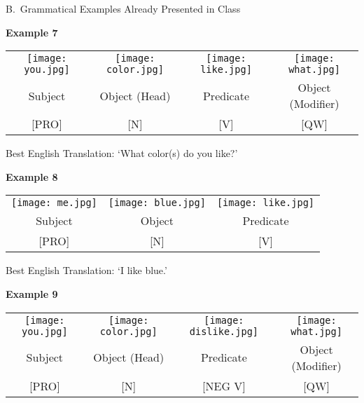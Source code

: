 \documentclass{tufte-book}
\begin{document}
\vspace{0.25cm}\noindent B.~Grammatical Examples Already Presented in Class

\vspace{0.25cm}\noindent \textbf{Example 7}
\begin{table*}[h!]
\begin{tabular}{c | c | c | c}
\texttt{[image: you.jpg]}&\texttt{[image: color.jpg]}&\texttt{[image: like.jpg]} & \texttt{[image: what.jpg]} \\
\footnotesize Subject & \footnotesize Object (Head) & \footnotesize Predicate & \footnotesize Object (Modifier)  \\
\footnotesize [PRO] & \footnotesize [N] & \footnotesize [V] &  \footnotesize [QW]\\
\end{tabular}
\end{table*}

Best English Translation: `What color(s) do you like?'

\vspace{0.25cm}\noindent \textbf{Example 8}
\begin{table*}[h!]
\begin{tabular}{c | c | c }
\texttt{[image: me.jpg]}&\texttt{[image: blue.jpg]}&\texttt{[image: like.jpg]} \\
\footnotesize Subject & \footnotesize Object & \footnotesize Predicate   \\
\footnotesize [PRO] & \footnotesize [N] & \footnotesize [V]   \\
\end{tabular}
\end{table*}

Best English Translation: `I like blue.'
\newpage

\vspace{0.25cm}\noindent \textbf{Example 9}
\begin{table*}[h!]
\begin{tabular}{c | c | c | c}
\texttt{[image: you.jpg]}&\texttt{[image: color.jpg]}&\texttt{[image: dislike.jpg]} & \texttt{[image: what.jpg]} \\
\footnotesize Subject & \footnotesize Object (Head) & \footnotesize Predicate & \footnotesize Object (Modifier)  \\
\footnotesize [PRO] & \footnotesize [N] & \footnotesize [NEG V] &  \footnotesize [QW]\\
\end{tabular}
\end{table*}
\end{document}
